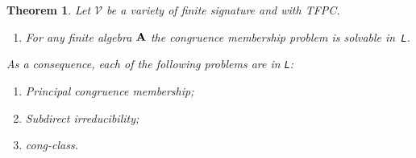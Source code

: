 \documentclass[10pt,a4paper]{amsart}
\theoremstyle{plain}
\newtheorem{thm}{Theorem}[section]
\theoremstyle{definition}
\newcommand{\congclass}{\textsf{cong-class}}
\newcommand{\up}[1]{\textup{#1}}
\begin{document}
\begin{thm}\label{thm:TFPC}
Let $\mathscr{V}$ be a variety of finite signature and with TFPC.  
\begin{enumerate}
\item[(0)] For any finite algebra ${\bf A}$ the \textsf{congruence membership} problem is solvable in~\texttt{L}.
\end{enumerate}  
As a consequence, each of the following problems are in \texttt{L}\up:
\begin{enumerate}
\item \textsf{Principal congruence membership}\up;
\item \textsf{Subdirect irreducibility}\up;
\item \congclass.
\end{enumerate}
\end{thm}
\end{document}
